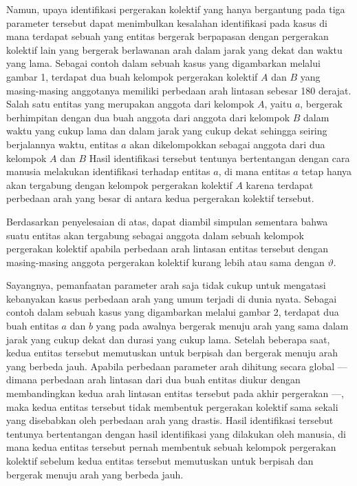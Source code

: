 Namun, upaya identifikasi pergerakan kolektif yang hanya bergantung pada tiga \iffalse \lionov{tiga?} \cristopher{fixed} \fi parameter tersebut dapat menimbulkan kesalahan identifikasi pada kasus \iffalse \sout{-kasus} \fi di mana terdapat sebuah yang entitas bergerak berpapasan dengan pergerakan kolektif lain yang bergerak berlawanan arah dalam jarak yang dekat dan waktu yang lama. Sebagai contoh dalam sebuah kasus yang digambarkan melalui gambar 1, terdapat dua buah kelompok pergerakan kolektif $A$ dan $B$ yang masing-masing anggotanya memiliki perbedaan arah lintasan sebesar 180 derajat. Salah satu entitas yang merupakan anggota dari kelompok $A$, yaitu $a$, bergerak berhimpitan dengan dua buah anggota dari anggota dari kelompok $B$ dalam waktu yang cukup lama dan dalam jarak yang cukup dekat sehingga seiring berjalannya waktu, entitas $a$ akan dikelompokkan sebagai anggota dari dua kelompok $A$ dan $B$ \iffalse \lionov{Mungkin bikin konvensi, nyebut entitas pake huruf kecil, nyebut kelompok pake huruf besar} \cristopher{ok deh, tapi perlu ditulis secara eksplisit ga ko?} .\fi Hasil identifikasi tersebut tentunya bertentangan dengan cara manusia melakukan identifikasi terhadap entitas $a$, di mana entitas $a$ tetap hanya akan tergabung dengan kelompok pergerakan kolektif $A$ karena terdapat perbedaan arah yang besar di antara kedua pergerakan kolektif tersebut.

Berdasarkan penyelesaian di atas, dapat diambil simpulan sementara bahwa suatu entitas akan tergabung sebagai anggota dalam sebuah kelompok pergerakan kolektif apabila perbedaan arah lintasan entitas tersebut dengan masing-masing anggota pergerakan kolektif kurang lebih atau sama dengan $\vartheta$. \iffalse \cristopher{kata-katanya gimana ya? maksudnya 'nih ada theorem baru'} \lionov{ah langsung aja tulis kalo mau, teorema 1, gak usah pake pengantar lagi} \cristopher{solved} \fi

\iffalse \lionov{kalo di sini mau ngomong tentang sudut, di penjelasan sebelumnya elu harus singgung sih, misalnya di gambar 1, ada perbedaan sudut sekian} \cristopher{solved} \fi

Sayangnya, pemanfaatan parameter arah saja tidak cukup untuk mengatasi kebanyakan kasus perbedaan arah yang umum terjadi di dunia nyata. Sebagai contoh dalam sebuah kasus yang digambarkan melalui gambar 2, terdapat dua buah entitas $a$ dan $b$ yang pada awalnya bergerak menuju arah yang sama dalam jarak yang cukup dekat dan durasi yang cukup lama. Setelah beberapa saat, kedua entitas tersebut memutuskan untuk berpisah dan bergerak menuju arah yang berbeda jauh. Apabila perbedaan parameter arah dihitung secara global --- dimana perbedaan arah lintasan dari dua buah entitas diukur dengan membandingkan kedua arah lintasan entitas tersebut pada akhir pergerakan ---, maka kedua entitas tersebut tidak membentuk pergerakan kolektif sama sekali yang disebabkan oleh perbedaan arah yang drastis. Hasil identifikasi tersebut tentunya bertentangan dengan hasil identifikasi yang dilakukan oleh manusia, di mana kedua entitas tersebut pernah membentuk sebuah kelompok pergerakan kolektif sebelum kedua entitas tersebut memutuskan untuk berpisah dan bergerak menuju arah yang berbeda jauh.

